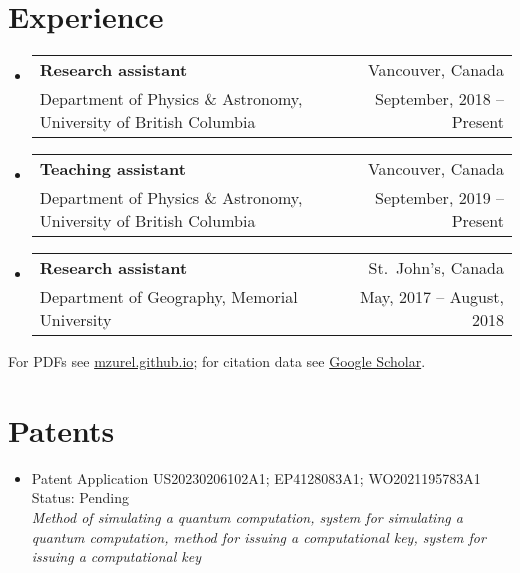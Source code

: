 \documentclass[letterpaper,11pt]{article}
\makeatletter
\newcommand{\ExperienceItem}[4]{
	\item{\vspace{-1pt}
		\begin{tabular*}{0.97\textwidth}{l@{\extracolsep{\fill}}r}
			\textbf{#1} & {#2}\\
			{#3} & {#4}
		\end{tabular*}
		\vspace{-5pt}
	}
}
\newcommand{\ExperienceSubItem}[2]{
	\item{\vspace{-3pt}
		\begin{tabular*}{0.92\textwidth}{l@{\extracolsep{\fill}}r}
			{\footnotesize #1} & {\footnotesize #2}
		\end{tabular*}
		\vspace{-5pt}
	}
}
\newcommand{\ConferenceItem}[3]{
	\item{\parbox{0.97\textwidth}{
		{#1}  \hfill {#2}\\
		\emph{#3}
	}}
}
\makeatother
\begin{document}
\section*{Experience}
\begin{itemize}[leftmargin=*]
	\ExperienceItem{Research assistant}{Vancouver, Canada}{Department of Physics \& Astronomy, University of British Columbia}{September, 2018 -- Present}
	
	\ExperienceItem{Teaching assistant}{Vancouver, Canada}{Department of Physics \& Astronomy, University of British Columbia}{September, 2019 -- Present}
	
	\ExperienceItem{Research assistant}{St.~John's, Canada}{Department of Geography, Memorial University}{May, 2017 -- August, 2018}
\end{itemize}

\nocite{ZurelCohenRaussendorf2023,ZurelRaussendorf2023,RaussendorfFeldmann2022,ZurelHeimendahl2022,OkayRaussendorf2021,Zurel2020,ZurelRaussendorf2020,RaussendorfZurel2020}
\printbibliography[title={Publications \& preprints}]
For PDFs see \href{mzurel.github.io}{mzurel.github.io}; for citation data see \href{https://scholar.google.com/citations?user=qUA_szUAAAAJ&hl=en&oi=ao}{Google Scholar}.


\section*{Patents}
\begin{itemize}[leftmargin=*]
	\ConferenceItem{Patent Application US20230206102A1; EP4128083A1; WO2021195783A1}{Status: Pending}{Method of simulating a quantum computation, system for simulating a quantum computation, method for issuing a computational key, system for issuing a computational key}
\end{itemize}
\end{document}
